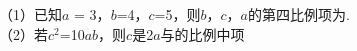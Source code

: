 （1）已知$a$ = 3，$b$=4，$c$=5，则$b$，$c$，$a$的第四比例项为\key{\hspace{2cm}}.\\

\hspace*{5mm}（2）若$c^2$=10$ab$，则$c$是2$a$与\key{\hspace{2cm}}的比例中项



